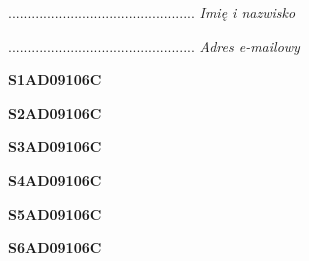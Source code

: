 \begin{turn}{90}\begin{minipage}{\linewidth} \vspace{20mm} ................................................  \textit{Imię i nazwisko}\end{minipage}\end{turn}

\begin{turn}{90}\begin{minipage}{\linewidth} \vspace{20mm} ................................................  \textit{Adres e-mailowy}\end{minipage}\end{turn}

\begin{turn}{90}\huge \begin{minipage}{\linewidth} \vspace{10mm}\textbf{S1AD09106C}\end{minipage}\end{turn}

\begin{turn}{90}\huge \begin{minipage}{\linewidth} \vspace{10mm}\textbf{S2AD09106C}\end{minipage}\end{turn}

\begin{turn}{90}\huge \begin{minipage}{\linewidth} \vspace{10mm}\textbf{S3AD09106C}\end{minipage}\end{turn}

\begin{turn}{90}\huge \begin{minipage}{\linewidth} \vspace{10mm}\textbf{S4AD09106C}\end{minipage}\end{turn}

\begin{turn}{90}\huge \begin{minipage}{\linewidth} \vspace{10mm}\textbf{S5AD09106C}\end{minipage}\end{turn}

\begin{turn}{90}\huge \begin{minipage}{\linewidth} \vspace{10mm}\textbf{S6AD09106C}\end{minipage}\end{turn}

